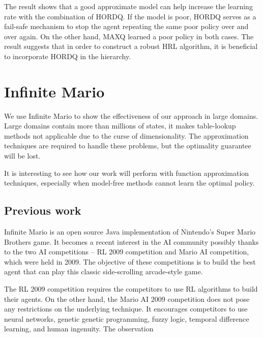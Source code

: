 The result shows that a good approximate model 
can help increase the learning rate with the combination of HORDQ. 
If the model is poor, HORDQ serves as a fail-safe mechanism to stop 
the agent repeating the same poor policy over and over again.
On the other hand, MAXQ learned a poor policy in both cases.  
The result suggests that in order to construct a robust HRL 
algorithm, it is beneficial to incorporate HORDQ in the hierarchy.





\section{Infinite Mario}
\label{se:MarioExp}
We use Infinite Mario to show the effectiveness of our approach in large domains. 
Large domains contain more than millions of states, it makes table-lookup methods not applicable
due to the curse of dimensionality. The approximation techniques are required to handle these
problems, but the optimality guarantee will be lost.

It is interesting to see how our work will perform with function approximation techniques,
especially when model-free methods cannot learn the optimal policy.

\subsection{Previous work}
Infinite Mario is an open source Java implementation of Nintendo's Super Mario Brothers game.
It becomes a recent interest in the AI community possibly thanks to
the two AI competitions -- RL 2009 competition and Mario AI competition, which were held in 2009.
The objective of these competitions is to build the best agent that
can play this classic side-scrolling arcade-style game.

The RL 2009 competition requires the competitors to use RL algorithms to build their agents.
On the other hand, the Mario AI 2009 competition \cite{Robin09} 
does not pose any restrictions on the underlying technique.
It encourages
competitors to use neural networks, genetic genetic programming, fuzzy logic, temporal difference learning, and human ingenuity.
The observation 

